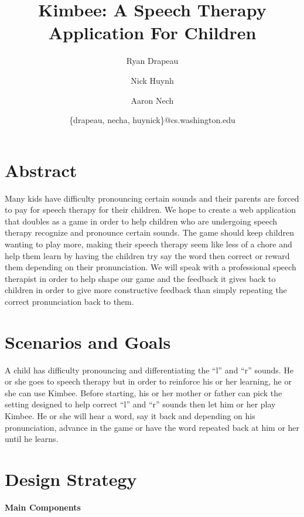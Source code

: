 \documentclass{article}
\begin{document}
\title{Kimbee: A Speech Therapy Application For Children}
\author{Ryan Drapeau \and Nick Huynh \and Aaron Nech}
\date{\{drapeau, necha, huynick\}@cs.washington.edu}

\maketitle

\section{Abstract}

Many kids have difficulty pronouncing certain sounds and their parents are forced to pay for speech therapy for their children. We hope to create a web application that doubles as a game in order to help children who are undergoing speech therapy recognize and pronounce certain sounds. The game should keep children wanting to play more, making their speech therapy seem like less of a chore and help them learn by having the children try say the word then correct or reward them depending on their pronunciation. We will speak with a professional speech therapist in order to help shape our game and the feedback it gives back to children in order to give more constructive feedback than simply repeating the correct pronunciation back to them.

\section{Scenarios and Goals}

A child has difficulty pronouncing and differentiating the ``l'' and ``r'' sounds. He or she goes to speech therapy but in order to reinforce his or her learning, he or she can use Kimbee. Before starting, his or her mother or father can pick the setting designed to help correct ``l'' and ``r'' sounds then let him or her play Kimbee. He or she will hear a word, say it back and depending on his pronunciation, advance in the game or have the word repeated back at him or her until he learns.

\section{Design Strategy}

\centerline{\textbf{Main Components}}
\end{document}
